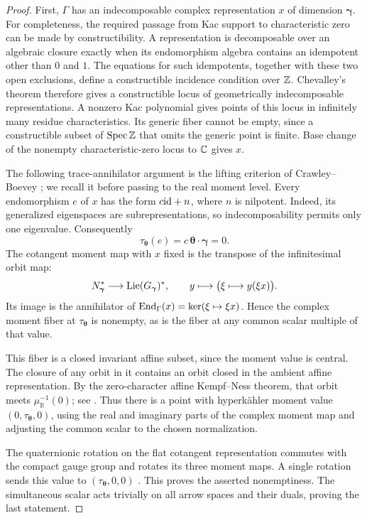 \begin{proof}
First, \(\Gamma\) has an indecomposable complex representation \(x\)
of dimension \(\boldsymbol\gamma\).
For completeness, the required passage from Kac support to characteristic
zero can be made by constructibility.  A representation is decomposable
over an algebraic closure exactly when its endomorphism algebra contains
an idempotent other than \(0\) and \(1\).  The equations for such
idempotents, together with these two open exclusions, define a
constructible incidence condition over \(\mathbb Z\).
Chevalley's theorem therefore gives a constructible locus of
geometrically indecomposable representations.  A nonzero Kac polynomial
gives points of this locus in infinitely many residue characteristics.
Its generic fiber cannot be empty, since a constructible subset of
\(\operatorname{Spec}\mathbb Z\) that omits the generic point is finite.  Base change of
the nonempty characteristic-zero locus to \(\mathbb C\) gives \(x\).

The following trace-annihilator argument is the lifting criterion of
Crawley--Boevey \cite[Lemma~3.1 and Theorem~3.3]{CrawleyBoevey01}; we
recall it before passing to the real moment level.
Every endomorphism \(e\) of \(x\) has the form \(c\mathrm{id}+n\), where \(n\)
is nilpotent.  Indeed, its generalized eigenspaces are subrepresentations,
so indecomposability permits only one eigenvalue.
Consequently
\[
 \tau_{\boldsymbol\theta}(e)
 =c\,\boldsymbol\theta\cdot\boldsymbol\gamma=0.
\]
The cotangent moment map with \(x\) fixed is the transpose of the
infinitesimal orbit map:
\[
 N_{\boldsymbol\gamma}^*\longrightarrow
       \operatorname{Lie}(G_{\boldsymbol\gamma})^*,
 \qquad
 y\longmapsto\bigl(\xi\longmapsto y(\xi x)\bigr).
\]
Its image is the annihilator of
\(\operatorname{End}_\Gamma(x)=\ker(\xi\mapsto\xi x)\).  Hence the complex moment
fiber at \(\tau_{\boldsymbol\theta}\) is nonempty, as is the fiber at
any common scalar multiple of that value.

This fiber is a closed invariant affine subset, since the moment value
is central.  The closure of any orbit in it contains an orbit closed
in the ambient affine representation.  By the zero-character affine
Kempf--Ness theorem, that orbit meets \(\mu_{\mathbb R}^{-1}(0)\);
see \cite[Theorem~6.1 and Corollary~6.2]{King94}.
Thus there is a point with hyperkähler moment value
\((0,\tau_{\boldsymbol\theta},0)\), using the real and imaginary
parts of the complex moment map and adjusting the common scalar to
the chosen normalization.

The quaternionic rotation on the flat cotangent representation commutes
with the compact gauge group and rotates its three moment maps.
A single rotation sends this value to
\((\tau_{\boldsymbol\theta},0,0)\)
\cite[\S3(D)]{HKLR87}.
This proves the asserted nonemptiness.  The simultaneous scalar acts
trivially on all arrow spaces and their duals, proving the last statement.
\end{proof}

